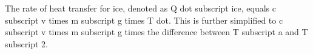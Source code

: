 The rate of heat transfer for ice, denoted as Q dot subscript ice, equals c subscript v times m subscript g times T dot. This is further simplified to c subscript v times m subscript g times the difference between T subscript a and T subscript 2.